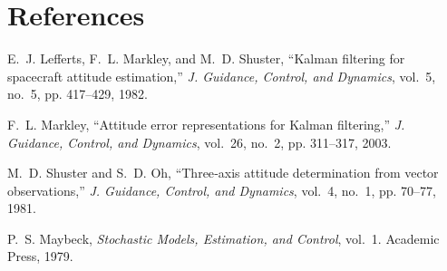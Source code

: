 \documentclass[12pt]{article}
\begin{document}
\section*{References}
\begin{thebibliography}{9}
E.~J. Lefferts, F.~L. Markley, and M.~D. Shuster, “Kalman filtering for spacecraft attitude estimation,” \emph{J. Guidance, Control, and Dynamics}, vol.~5, no.~5, pp. 417–429, 1982.

F.~L. Markley, “Attitude error representations for Kalman filtering,” \emph{J. Guidance, Control, and Dynamics}, vol.~26, no.~2, pp. 311–317, 2003.

M.~D. Shuster and S.~D. Oh, “Three‐axis attitude determination from vector observations,” \emph{J. Guidance, Control, and Dynamics}, vol.~4, no.~1, pp. 70–77, 1981.

P.~S. Maybeck, \emph{Stochastic Models, Estimation, and Control}, vol.~1. Academic Press, 1979.

\end{thebibliography}
\end{document}
